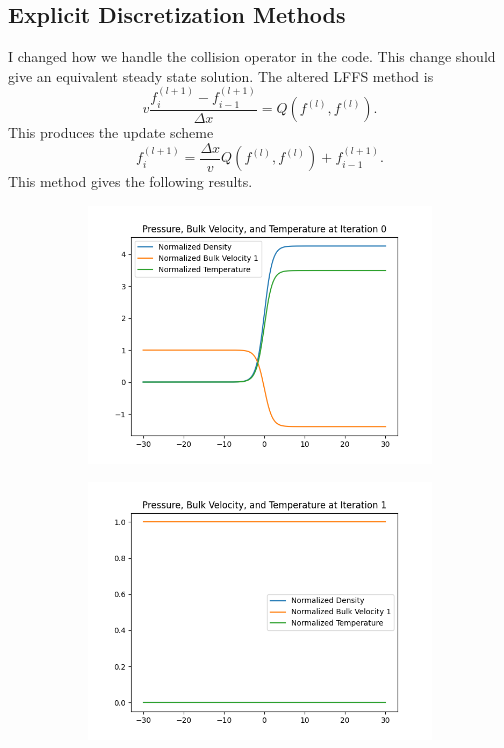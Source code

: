 \documentclass{article}
\begin{document}
\subsection{Explicit Discretization Methods}
I changed how we handle the collision operator in the code. This change should give an equivalent steady state solution. The altered LFFS method is
\[
    v \frac{f_i^{(l+1)} - f_{i-1}^{(l+1)}}{\Delta x} = Q(f^{(l)}, f^{(l)}).
\]
This produces the update scheme 
\[
    f_i^{(l+1)}  = \frac{\Delta x}{v} Q(f^{(l)}, f^{(l)}) + f_{i-1}^{(l+1)}.
\]
This method gives the following results.
\begin{figure}[H]
    \centering
    \begin{subfigure}[b]{0.45\textwidth}
    \includegraphics[width=\textwidth]{imgs/lax_friedrichs/iter0.png}
    \end{subfigure}
    \hfill
    \begin{subfigure}[b]{0.45\textwidth}
    \includegraphics[width=\textwidth]{imgs/lax_friedrichs/iter1.png}
    \end{subfigure}
    

\end{figure}
\end{document}
